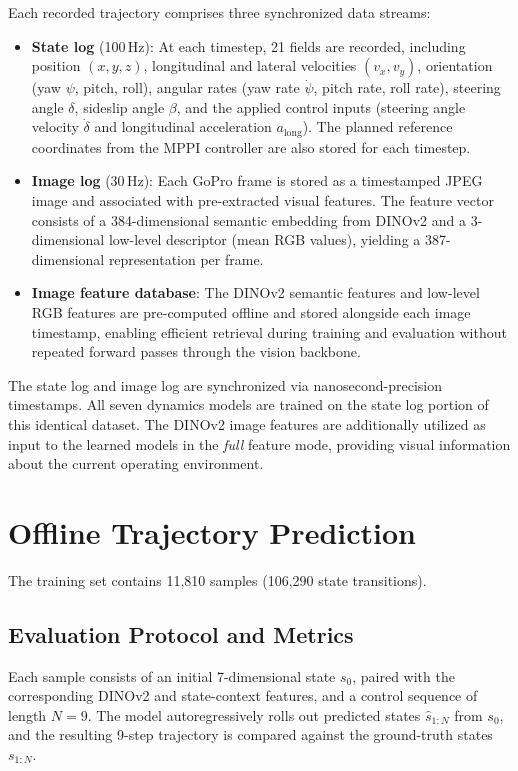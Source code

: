 Each recorded trajectory comprises three synchronized data streams:
\begin{itemize}
    \item \textbf{State log} (100\,Hz): At each timestep, 21 fields are recorded, including position $(x, y, z)$, longitudinal and lateral velocities $(v_x, v_y)$, orientation (yaw $\psi$, pitch, roll), angular rates (yaw rate $\dot{\psi}$, pitch rate, roll rate), steering angle $\delta$, sideslip angle $\beta$, and the applied control inputs (steering angle velocity $\dot{\delta}$ and longitudinal acceleration $a_{\text{long}}$). The planned reference coordinates from the MPPI controller are also stored for each timestep.
    \item \textbf{Image log} (30\,Hz): Each GoPro frame is stored as a timestamped JPEG image and associated with pre-extracted visual features. The feature vector consists of a 384-dimensional semantic embedding from DINOv2 and a 3-dimensional low-level descriptor (mean RGB values), yielding a 387-dimensional representation per frame.
    \item \textbf{Image feature database}: The DINOv2 semantic features and low-level RGB features are pre-computed offline and stored alongside each image timestamp, enabling efficient retrieval during training and evaluation without repeated forward passes through the vision backbone.
\end{itemize}

The state log and image log are synchronized via nanosecond-precision timestamps. All seven dynamics models are trained on the state log portion of this identical dataset. The DINOv2 image features are additionally utilized as input to the learned models in the \emph{full} feature mode, providing visual information about the current operating environment.

\section{Offline Trajectory Prediction}
\label{sec:offline}

The training set contains 11,810 samples (106,290 state transitions).

\subsection{Evaluation Protocol and Metrics}

Each sample consists of an initial 7-dimensional state $s_0$, paired with the corresponding DINOv2 and state-context features, and a control sequence of length $N = 9$. The model autoregressively rolls out predicted states $\hat{s}_{1:N}$ from $s_0$, and the resulting 9-step trajectory is compared against the ground-truth states $s_{1:N}$.


